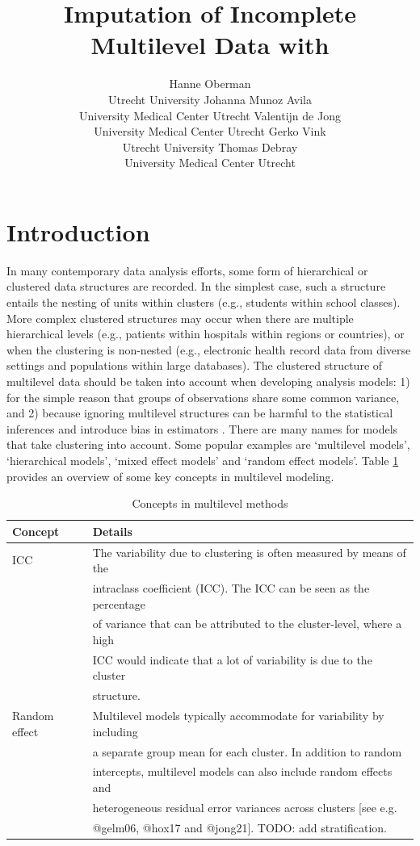 \documentclass[
]{jss}
\author{
Hanne Oberman\\Utrecht University \And Johanna Munoz Avila\\University
Medical Center Utrecht \AND Valentijn de Jong\\University Medical
Center Utrecht \And Gerko Vink\\Utrecht University \AND Thomas
Debray\\University Medical Center Utrecht
}
\title{Imputation of Incomplete Multilevel Data with \pkg{mice}}
\begin{document}
\hypertarget{introduction}{%
\section{Introduction}\label{introduction}}

In many contemporary data analysis efforts, some form of hierarchical or
clustered data structures are recorded. In the simplest case, such a
structure entails the nesting of units within clusters (e.g., students
within school classes). More complex clustered structures may occur when
there are multiple hierarchical levels (e.g., patients within hospitals
within regions or countries), or when the clustering is non-nested
(e.g., electronic health record data from diverse settings and
populations within large databases). The clustered structure of
multilevel data should be taken into account when developing analysis
models: 1) for the simple reason that groups of observations share some
common variance, and 2) because ignoring multilevel structures can be
harmful to the statistical inferences and introduce bias in estimators
\citep{hox17}. There are many names for models that take clustering into
account. Some popular examples are `multilevel models', `hierarchical
models', `mixed effect models' and `random effect models'. Table
\ref{tab:clus} provides an overview of some key concepts in multilevel
modeling.

\begin{table}[tb]
\caption{Concepts in multilevel methods}
\label{tab:clus}
\centering
\begin{tabular}{ll}
\hline
\textbf{Concept} & \textbf{Details}   \\
\hline
ICC                 & The variability due to clustering is often measured by means of the \\
                    & intraclass coefficient (ICC). The ICC can be seen as the percentage \\
                    & of variance that can be attributed to the cluster-level, where a high \\
                    & ICC would indicate that a lot of variability is due to the cluster \\
                    & structure. \\
Random effect       & Multilevel models typically accommodate for variability by including \\
                    & a separate group mean for each cluster. In addition to random \\
                    & intercepts, multilevel models can also include random effects and \\
                    & heterogeneous residual error variances across clusters [see e.g. \\
                    & @gelm06, @hox17 and @jong21]. TODO: add stratification. \\
\hline
\end{tabular}
\end{table}
\end{document}
